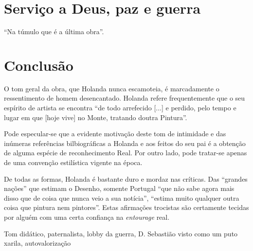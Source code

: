 \documentclass{article}
\begin{document}
\section{Serviço a Deus, paz e guerra }

``Na túmulo que é a última obra''.

\section{Conclusão}

O tom geral da obra, que Holanda nunca escamoteia, é marcadamente o
ressentimento de homem desencantado. Holanda refere frequentemente que
o seu espírito de artista se encontra ``de todo arrefecido [...] e
perdido, pelo tempo e lugar em que [hoje vive] no Monte, tratando
doutra Pintura''.

Pode especular-se que a evidente motivação deste tom de intimidade e
das inúmeras referências bilbiográficas a Holanda e aos feitos do seu
pai é a obtenção de alguma espécie de reconhecimento Real. Por outro
lado, pode tratar-se apenas de uma convenção estilística vigente na
época.

De todas as formas, Holanda é bastante duro e mordaz nas críticas. Das
``grandes nações'' que estimam o Desenho, somente Portugal ``que não
sabe agora mais disso que de coisa que nunca veio a sua notícia'',
``estima muito qualquer outra coisa que pintura nem pintores''. Estas
afirmações trocistas são certamente tecidas por alguém com uma certa
confiança na \emph{entourage} real.


Tom didático, paternalista, lobby da guerra, D. Sebastião visto como
um puto xarila, autovalorização

\printbibliography[heading=bibliography,title={Bibliografia}]
\end{document}
